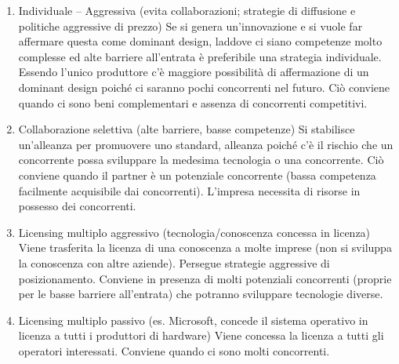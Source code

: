 \documentclass{article}
\begin{document}
\begin{enumerate}
	\item Individuale – Aggressiva (evita collaborazioni; strategie di diffusione e politiche aggressive
	di prezzo)
	Se si genera un’innovazione e si vuole far affermare questa come dominant design, laddove
	ci siano competenze molto complesse ed alte barriere all’entrata è preferibile una strategia
	individuale. Essendo l’unico produttore c’è maggiore possibilità di affermazione di un
	dominant design poiché ci saranno pochi concorrenti nel futuro. Ciò conviene quando ci
	sono beni complementari e assenza di concorrenti competitivi.
	\item Collaborazione selettiva (alte barriere, basse competenze)
	Si stabilisce un’alleanza per promuovere uno standard, alleanza poiché c’è il rischio che un
	concorrente possa sviluppare la medesima tecnologia o una concorrente. Ciò conviene
	quando il partner è un potenziale concorrente (bassa competenza facilmente acquisibile
	dai concorrenti). L’impresa necessita di risorse in possesso dei concorrenti.
	\item Licensing multiplo aggressivo (tecnologia/conoscenza concessa in licenza)
	Viene trasferita la licenza di una conoscenza a molte imprese (non si sviluppa la conoscenza
	con altre aziende). Persegue strategie aggressive di posizionamento. Conviene in presenza
	di molti potenziali concorrenti (proprie per le basse barriere all’entrata) che potranno
	sviluppare tecnologie diverse.
	\item Licensing multiplo passivo (es. Microsoft, concede il sistema operativo in licenza a tutti i
	produttori di hardware)
	Viene concessa la licenza a tutti gli operatori interessati. Conviene quando ci sono molti
	concorrenti.
\end{enumerate}
\end{document}
